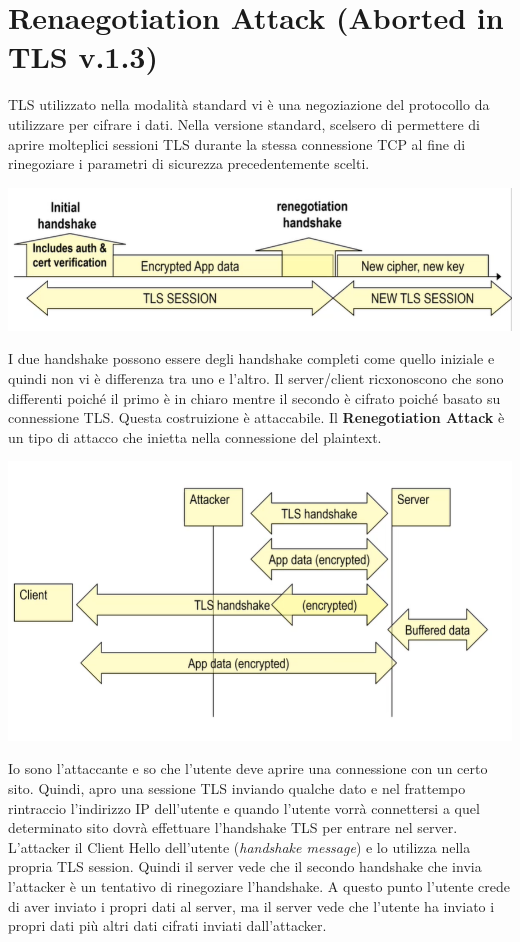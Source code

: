 \documentclass{book}
\theoremstyle{remark}
\begin{document}
\section{Renaegotiation Attack (Aborted in TLS v\@.1\@.3)}
TLS utilizzato nella modalità standard vi è una negoziazione del protocollo da utilizzare per cifrare i dati\@. Nella versione standard, scelsero di permettere di aprire molteplici sessioni TLS durante la stessa connessione TCP al fine di rinegoziare i parametri di sicurezza precedentemente scelti\@.
\begin{center}
	\includegraphics[scale=0.6]{2021-12-10-14-12-07.png}
\end{center}
I due handshake possono essere degli handshake completi come quello iniziale e quindi non vi è differenza tra uno e l'altro\@. Il server/client ricxonoscono che sono differenti poiché il primo è in chiaro mentre il secondo è cifrato poiché basato su connessione TLS\@. Questa costruizione è attaccabile\@.
Il \textbf{Renegotiation Attack} è un tipo di attacco che inietta nella connessione del plaintext\@.
\begin{center}
	\includegraphics[scale=0.6]{2021-12-10-14-17-12.png}
\end{center}
Io sono l'attaccante e so che l'utente deve aprire una connessione con un certo sito\@. Quindi, apro una sessione TLS inviando qualche dato e nel frattempo rintraccio l'indirizzo IP dell'utente e quando l'utente vorrà connettersi a quel determinato sito dovrà effettuare l'handshake TLS per entrare nel server\@. L'attacker il Client Hello dell'utente (\emph{handshake message}) e lo utilizza nella propria TLS session\@. Quindi il server vede che il secondo handshake che invia l'attacker è un tentativo di rinegoziare l'handshake\@. A questo punto l'utente crede di aver inviato i propri dati al server, ma il server vede che l'utente ha inviato i propri dati più altri dati cifrati inviati dall'attacker\@.
\end{document}
